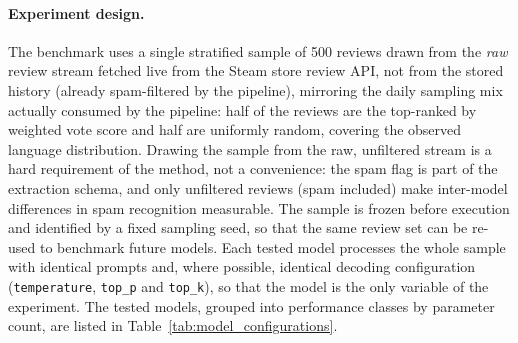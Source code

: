 \paragraph{Experiment design.} The benchmark uses a single stratified sample of 500 reviews drawn from the \emph{raw} review stream fetched live from the Steam store review API, not from the stored history (already spam-filtered by the pipeline), mirroring the daily sampling mix actually consumed by the pipeline: half of the reviews are the top-ranked by weighted vote score and half are uniformly random, covering the observed language distribution. Drawing the sample from the raw, unfiltered stream is a hard requirement of the method, not a convenience: the spam flag is part of the extraction schema, and only unfiltered reviews (spam included) make inter-model differences in spam recognition measurable. The sample is frozen before execution and identified by a fixed sampling seed, so that the same review set can be re-used to benchmark future models. Each tested model processes the whole sample with identical prompts and, where possible, identical decoding configuration (\texttt{temperature}, \texttt{top\_p} and \texttt{top\_k}), so that the model is the only variable of the experiment. The tested models, grouped into performance classes by parameter count, are listed in Table~\ref{tab:model_configurations}.

